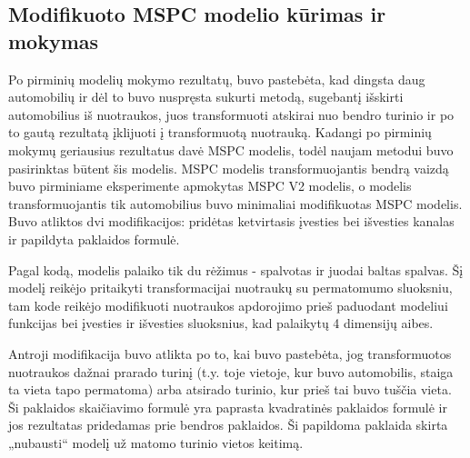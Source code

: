 \documentclass{VUMIFPSbakalaurinis}
\begin{document}
    
    
    \subsection{Modifikuoto MSPC modelio kūrimas ir mokymas}
        Po pirminių modelių mokymo rezultatų, buvo pastebėta, kad dingsta daug automobilių ir dėl to buvo nuspręsta sukurti metodą, sugebantį išskirti automobilius iš nuotraukos, juos transformuoti atskirai nuo bendro turinio ir po to gautą rezultatą įklijuoti į transformuotą nuotrauką. Kadangi po pirminių mokymų geriausius rezultatus davė MSPC modelis, todėl naujam metodui buvo pasirinktas būtent šis modelis. MSPC modelis transformuojantis bendrą vaizdą buvo pirminiame eksperimente apmokytas MSPC V2 modelis, o modelis transformuojantis tik automobilius buvo minimaliai modifikuotas MSPC modelis. Buvo atliktos dvi modifikacijos: pridėtas ketvirtasis įvesties bei išvesties kanalas ir papildyta paklaidos formulė. 
        
        Pagal kodą, modelis palaiko tik du rėžimus - spalvotas ir juodai baltas spalvas. Šį modelį reikėjo pritaikyti transformacijai nuotraukų su permatomumo sluoksniu, tam kode reikėjo modifikuoti nuotraukos apdorojimo prieš paduodant modeliui funkcijas bei įvesties ir išvesties sluoksnius, kad palaikytų 4 dimensijų aibes. 
        
        Antroji modifikacija buvo atlikta po to, kai buvo pastebėta, jog transformuotos nuotraukos dažnai prarado turinį (t.y. toje vietoje, kur buvo automobilis, staiga ta vieta tapo permatoma) arba atsirado turinio, kur prieš tai buvo tuščia vieta. Ši paklaidos skaičiavimo formulė yra paprasta kvadratinės paklaidos formulė ir jos rezultatas pridedamas prie bendros paklaidos. Ši papildoma paklaida skirta „nubausti“ modelį už matomo turinio vietos keitimą.
\end{document}
